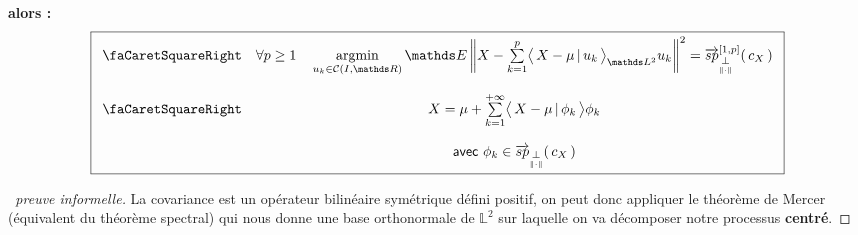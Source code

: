 \begin{minipage}{\textwidth}
\begin{thm}
		\textbf{alors :}
		\begin{equation*}
			\boxed{
				\begin{array}{cc}
					\textsf{\faCaretSquareRight} &

					\forall p \geq 1
					\quad
					\argmin\limits_{u_k \in \mathcal C(I, \mathds R)} \mathds E \left\Vert X - \sum\limits_{k=1}^p \prodscalselon {X - \mu} {u_k} {\mathds L^2} u_k \right\Vert^2 = \overrightarrow{sp}_{\orthonormal}^{[1,p]}( \, c_X \, )

					\\
					\\
					\textsf{\faCaretSquareRight} & X = \mu + \sum\limits_{k=1}^{+\infty} \prodscal {X - \mu} {\phi_k} \phi_k
					\\
					                             &
					\\
					                             & \textsf{avec } \phi_k \in \overrightarrow{sp}_{\orthonormal}( \, c_X \, )
				\end{array}
			}
		\end{equation*}

		\label{thm:KL}
	\end{thm}
\end{minipage}
\begin{proof}[\faCogs \, preuve informelle]
	La covariance est un opérateur bilinéaire symétrique défini positif, on peut donc appliquer le théorème de Mercer (équivalent du théorème spectral) qui nous donne une base orthonormale de $\mathds L^2$ sur laquelle on va décomposer notre processus \textbf{centré}.
\end{proof}
